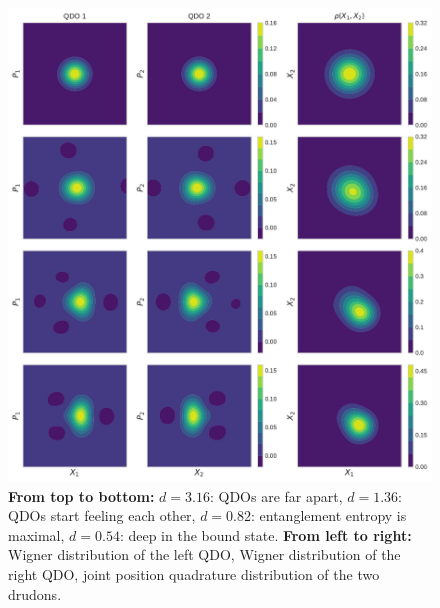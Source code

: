 \documentclass[reprint, amsmath, amssymb, floatfix, aps, pra]{revtex4-2}
\begin{document}
    \begin{figure}
        \includegraphics[scale=0.75]{figures/wigners_joint.pdf}
        \caption{\label{fig:wigners_joint}\textbf{From top to bottom:} $d=3.16$: QDOs are far apart, $d=1.36$: QDOs start feeling each other, $d=0.82$: entanglement entropy is maximal, $d=0.54$: deep in the bound state. \textbf{From left to right:} Wigner distribution of the left QDO, Wigner distribution of the right QDO, joint position quadrature distribution of the two drudons.}
    \end{figure}
\end{document}
